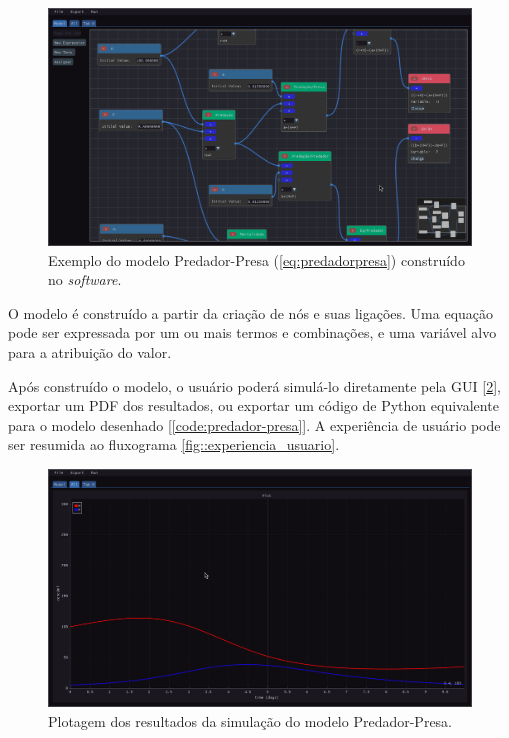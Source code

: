 \documentclass[
	12pt,				%
	openright,			%
	oneside,			%
	a4paper,			%
	main=brazil,
	english,			%
	]{ufsj-abntex2}
\begin{document}
\begin{figure}[h]
    \centering
    \includegraphics[scale=0.35]{imgs/ode-designer/predador-presa.png} 
    \caption{Exemplo do modelo Predador-Presa (\ref{eq:predadorpresa}) construído no \textit{software}.}
    \label{fig:gui-predador-presa}
\end{figure}

O modelo é construído a partir da criação de nós e suas ligações. Uma equação pode ser expressada por um ou mais termos e combinações, e uma variável alvo para a atribuição do valor.

Após construído o modelo, o usuário poderá simulá-lo diretamente pela GUI [\ref{fig:gui-grafico-all}], exportar um PDF dos resultados, ou exportar um código de Python equivalente para o modelo desenhado [\ref{code:predador-presa}]. A experiência de usuário pode ser resumida ao fluxograma \ref{fig::experiencia_usuario}.

\begin{figure}[h]
    \centering
    \includegraphics[scale=0.35]{imgs/ode-designer/grafico-all.png} 
    \caption{Plotagem dos resultados da simulação do modelo Predador-Presa.}
    \label{fig:gui-grafico-all}
\end{figure}
\end{document}
